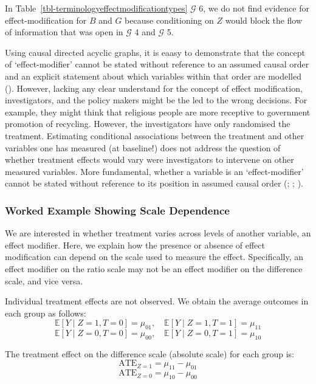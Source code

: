\documentclass[
  single column]{article}
\begin{document}
In Table~\ref{tbl-terminologyeffectmodificationtypes} \(\mathcal{G}\) 6,
we do not find evidence for effect-modification for \(B\) and \(G\)
because conditioning on \(Z\) would block the flow of information that
was open in \(\mathcal{G}\) 4 and \(\mathcal{G}\) 5.

Using causal directed acyclic graphs, it is eaasy to demonstrate that
the concept of `effect-modifier' cannot be stated without reference to
an assumed causal order and an explicit statement about which variables
within that order are modelled
(). However, lacking any
clear understand for the concept of effect modification, investigators,
and the policy makers might be the led to the wrong decisions. For
example, they might think that religious people are more receptive to
government promotion of recycling. However, the investigators have only
randomised the treatment. Estimating conditional associations between
the treatment and other variables one has measured (at baseline!) does
not address the question of whether treatment effects would vary were
investigators to intervene on other measured variables. More
fundamental, whether a variable is an `effect-modifier' cannot be stated
without reference to its position in assumed causal order
(;
;
).

\subsubsection{Worked Example Showing Scale
Dependence}\label{worked-example-showing-scale-dependence}

We are interested in whether treatment varies across levels of another
variable, an effect modifier. Here, we explain how the presence or
absence of effect modification can depend on the scale used to measure
the effect. Specifically, an effect modifier on the ratio scale may not
be an effect modifier on the difference scale, and vice versa.

Individual treatment effects are not observed. We obtain the average
outcomes in each group as follows: \[
\mathbb{E}[Y \mid Z = 1, T = 0] = \mu_{01}, \quad \mathbb{E}[Y \mid Z = 1, T = 1] = \mu_{11}
\] \[
\mathbb{E}[Y \mid Z = 0, T = 0] = \mu_{00}, \quad \mathbb{E}[Y \mid Z = 0, T = 1] = \mu_{10}
\]

The treatment effect on the difference scale (absolute scale) for each
group is: \[
\text{ATE}_{Z = 1} = \mu_{11} - \mu_{01}
\] \[
\text{ATE}_{Z = 0} = \mu_{10} - \mu_{00}
\]
\end{document}
